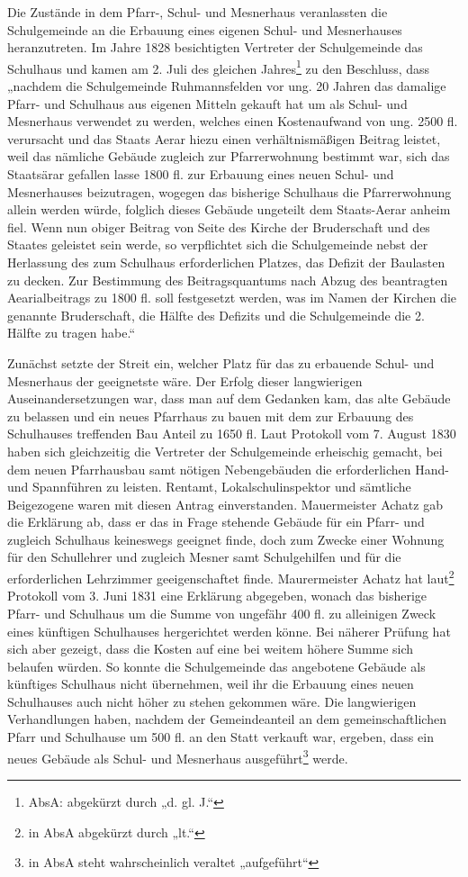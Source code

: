 \documentclass[12pt,a4paper]{book}
\begin{document}
Die Zustände in dem Pfarr-, Schul- und Mesnerhaus veranlassten die
Schulgemeinde an die Erbauung eines eigenen Schul- und Mesnerhauses
heranzutreten. Im Jahre 1828 besichtigten Vertreter der Schulgemeinde
das Schulhaus und kamen am 2. Juli des gleichen Jahres\footnote{AbsA:
abgekürzt durch „d. gl. J.“} zu den Beschluss, dass „nachdem die
Schulgemeinde Ruhmannsfelden vor ung. 20 Jahren das damalige Pfarr- und
Schulhaus aus eigenen Mitteln gekauft hat um als Schul- und Mesnerhaus
verwendet zu werden, welches einen Kostenaufwand von ung. 2500 fl.
verursacht und das Staats Aerar hiezu einen verhältnismäßigen Beitrag
leistet, weil das nämliche Gebäude zugleich zur Pfarrerwohnung bestimmt
war, sich das Staatsärar gefallen lasse 1800 fl. zur Erbauung eines
neuen Schul- und Mesnerhauses beizutragen, wogegen das bisherige
Schulhaus die Pfarrerwohnung allein werden würde, folglich dieses
Gebäude ungeteilt dem Staats-Aerar anheim fiel. Wenn nun obiger Beitrag
von Seite des Kirche der Bruderschaft und des Staates geleistet sein
werde, so verpflichtet sich die Schulgemeinde nebst der Herlassung des
zum Schulhaus erforderlichen Platzes, das Defizit der Baulasten zu
decken. Zur Bestimmung des Beitragsquantums nach Abzug des beantragten
Aearialbeitrags zu 1800 fl. soll festgesetzt werden, was im Namen der
Kirchen die genannte Bruderschaft, die Hälfte des Defizits und die
Schulgemeinde die 2. Hälfte zu tragen habe.“

Zunächst setzte der Streit ein, welcher Platz für das zu erbauende
Schul- und Mesnerhaus der geeignetste wäre. Der Erfolg dieser
langwierigen Auseinandersetzungen war, dass man auf dem Gedanken kam,
das alte Gebäude zu belassen und ein neues Pfarrhaus zu bauen mit dem
zur Erbauung des Schulhauses treffenden Bau Anteil zu 1650 fl. Laut
Protokoll vom 7. August 1830 haben sich gleichzeitig die Vertreter der
Schulgemeinde erheischig gemacht, bei dem neuen Pfarrhausbau samt
nötigen Nebengebäuden die erforderlichen Hand- und Spannführen zu
leisten. Rentamt, Lokalschulinspektor und sämtliche Beigezogene waren
mit diesen Antrag einverstanden. Mauermeister Achatz gab die Erklärung
ab, dass er das in Frage stehende Gebäude für ein Pfarr- und zugleich
Schulhaus keineswegs geeignet finde, doch zum Zwecke einer Wohnung für
den Schullehrer und zugleich Mesner samt Schulgehilfen und für die
erforderlichen Lehrzimmer geeigenschaftet finde. Maurermeister Achatz
hat laut\footnote{in AbsA abgekürzt durch „lt.“} Protokoll vom 3. Juni
1831 eine Erklärung abgegeben, wonach das bisherige Pfarr- und Schulhaus
um die Summe von ungefähr 400 fl. zu alleinigen Zweck eines künftigen
Schulhauses hergerichtet werden könne. Bei näherer Prüfung hat sich aber
gezeigt, dass die Kosten auf eine bei weitem höhere Summe sich belaufen
würden. So konnte die Schulgemeinde das angebotene Gebäude als künftiges
Schulhaus nicht übernehmen, weil ihr die Erbauung eines neuen
Schulhauses auch nicht höher zu stehen gekommen wäre. Die langwierigen
Verhandlungen haben, nachdem der Gemeindeanteil an dem
gemeinschaftlichen Pfarr und Schulhause um 500 fl. an den Statt verkauft
war, ergeben, dass ein neues Gebäude als Schul- und Mesnerhaus
ausgeführt\footnote{in AbsA steht wahrscheinlich veraltet „aufgeführt“}
werde.
\end{document}

